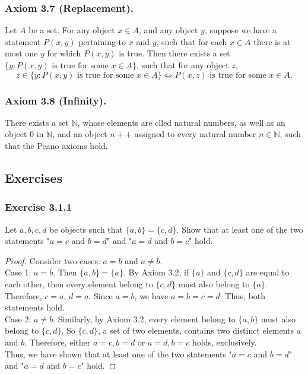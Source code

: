\documentclass[12pt, letter]{article}
\begin{document}
\subsubsection*{Axiom 3.7 (Replacement).}
Let $A$ be a set. For any object $x\in A$, and any object $y$, suppose we have a statement $P(x,y)$ pertaining to $x$ and $y$, such that for each $x\in A$ there is at most one $y$
for which $P(x,y)$ is true. Then there exists a set $\{y:P(x,y)\text{ is true for some }x\in A\}$, such that for any object $z$,
\begin{equation*}
    z\in\{y:P(x,y)\text{ is true for some }x\in A\}\iff P(x,z) \text{ is true for some }x\in A. 
\end{equation*}
\subsubsection*{Axiom 3.8 (Infinity).}
There exists a set $\mathbb{N}$, whose elements are clled natural numbers, as well as an object 0 in $\mathbb{N}$, and an object $n++$ assigned to every natural number $n\in\mathbb{N}$, 
such that the Peano axioms hold.



\subsection*{Exercises}
\subsubsection*{Exercise 3.1.1}
Let $a,b,c,d$ be objects such that $\{a,b\}=\{c,d\}$. Show that at least one of the two statements "$a=c$ and $b=d$" and "$a=d$ and $b=c$" hold.
\begin{proof}
    Consider two cases: $a=b$ and $a\ne b$.\\
    Case 1: $a=b$. Then $\{a,b\}=\{a\}$. By Axiom 3.2, if $\{a\}$ and $\{c,d\}$ are equal to each other, then every element belong to $\{c,d\}$ must also belong to $\{a\}$. 
    Therefore, $c=a$, $d=a$. Since $a=b$, we have $a=b=c=d$. Thus, both statements hold.\\
    Case 2: $a\ne b$. Similarly, by Axiom 3.2, every element belong to $\{a,b\}$ must also belong to $\{c,d\}$. So $\{c,d\}$, a set of two elements, contains two distinct elements $a$ and $b$. Therefore, 
    either $a=c, b=d$ or $a=d, b=c$ holds, exclusively.\\
    Thus, we have shown that at least one of the two statements "$a=c$ and $b=d$" and "$a=d$ and $b=c$" hold.
\end{proof}
\end{document}
